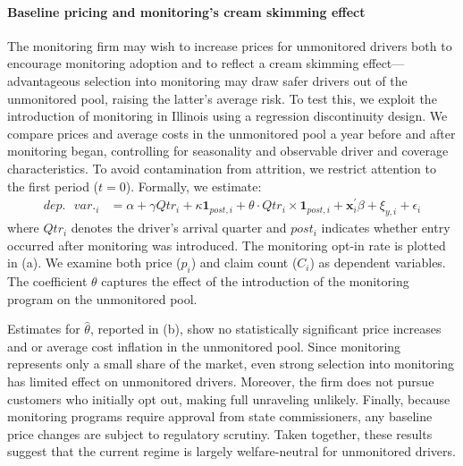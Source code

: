 \setcounter{figure}{0}
\setcounter{table}{0}

\paragraph{Baseline pricing and monitoring's cream skimming effect}

The monitoring firm may wish to increase prices for unmonitored drivers both to encourage monitoring adoption and to reflect a cream skimming effect---advantageous selection into monitoring may draw safer drivers out of the unmonitored pool, raising the latter's average risk. To test this, we exploit the introduction of monitoring in Illinois using a regression discontinuity design. We compare prices and average costs in the unmonitored pool a year before and after monitoring began, controlling for seasonality and observable driver and coverage characteristics. To avoid contamination from attrition, we restrict attention to the first period ($t = 0$). Formally, we estimate:
\begin{align}
dep.\text{ }var._{i} & =\alpha+\gamma Qtr_{i}+\kappa\mathbf{1}_{post,i}+\theta\cdot Qtr_{i}\times\mathbf{1}_{post,i}+\mathbf{x}_{i}^{\prime}\beta+\xi_{y,i}+\epsilon_{i}\label{eq:cs_claim}
\end{align}
where $Qtr_i$ denotes the driver's arrival quarter and $post_i$ indicates whether entry occurred after monitoring was introduced. The monitoring opt-in rate is plotted in (a). We examine both price ($p_i$) and claim count ($C_i$) as dependent variables. The coefficient $\theta$ captures the effect of the introduction of the monitoring program on the unmonitored pool.

Estimates for $\hat{\theta}$, reported in (b), show no statistically significant price increases and or average cost inflation in the unmonitored pool. Since monitoring represents only a small share of the market, even strong selection into monitoring has limited effect on unmonitored drivers. Moreover, the firm does not pursue customers who initially opt out, making full unraveling unlikely. Finally, because monitoring programs require approval from state commissioners, any baseline price changes are subject to regulatory scrutiny. Taken together, these results suggest that the current regime is largely welfare-neutral for unmonitored drivers.


